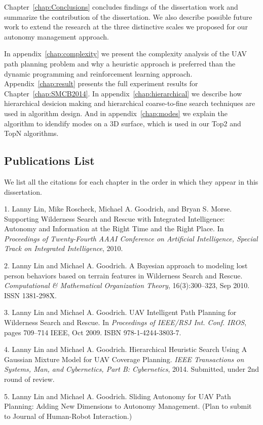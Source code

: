Chapter~\ref{chap:Conclusions} concludes findings of the dissertation work and summarize the contribution of the dissertation. 
We also describe possible future work to extend the research at the three distinctive scales we proposed for our autonomy management approach.

In appendix~\ref{chap:complexity} we present the complexity analysis of the UAV path planning problem and why a heuristic approach is preferred than the dynamic programming and reinforcement learning approach. Appendix~\ref{chap:result} presents the full experiment results for Chapter~\ref{chap:SMCB2014}. In appendix~\ref{chap:hierarchical} we describe how hierarchical desicion making and hierarchical coarse-to-fine search techniques are used in algorithm design. And in appendix~\ref{chap:modes} we explain the algorithm to idendify modes on a 3D surface, which is used in our Top2 and TopN algorithms.

\subsection{Publications List}

We list all the citations for each chapter in the order in which they appear in this dissertation.

1. Lanny Lin, Mike Roscheck, Michael A. Goodrich, and Bryan S. Morse. Supporting Wilderness Search and Rescue with Integrated Intelligence: Autonomy and Information at the Right Time and the Right Place. In \textit{Proceedings of Twenty-Fourth AAAI Conference on Artificial Intelligence, Special Track on Integrated Intelligence}, 2010.

2. Lanny Lin and Michael A. Goodrich. A Bayesian approach to modeling lost person behaviors based on terrain features in Wilderness Search and Rescue. \textit{Computational \& Mathematical Organization Theory}, 16(3):300--323, Sep 2010. ISSN 1381-298X.

3. Lanny Lin and Michael A. Goodrich. UAV Intelligent Path Planning for Wilderness Search and Rescue. In \textit{Proceedings of IEEE/RSJ Int. Conf. IROS}, pages 709--714 IEEE, Oct 2009. ISBN 978-1-4244-3803-7.

4. Lanny Lin and Michael A. Goodrich. Hierarchical Heuristic Search Using A Gaussian Mixture Model for UAV Coverage Planning. \textit{IEEE Transactions on Systems, Man, and Cybernetics, Part B: Cybernetics}, 2014. Submitted, under 2nd round of review.

5. Lanny Lin and Michael A. Goodrich. Sliding Autonomy for UAV Path Planning: Adding New Dimensions to Autonomy Management. (Plan to submit to Journal of Human-Robot Interaction.)